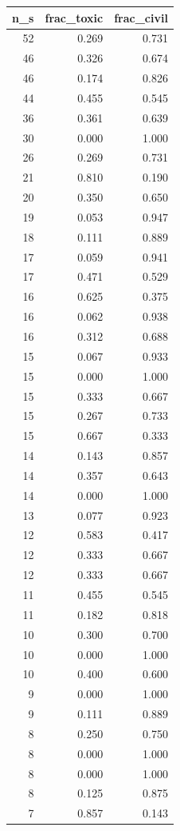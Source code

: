 \begin{tabular}{rrr}
\toprule
n_s & frac_toxic & frac_civil \\
\midrule
52 & 0.269 & 0.731 \\
46 & 0.326 & 0.674 \\
46 & 0.174 & 0.826 \\
44 & 0.455 & 0.545 \\
36 & 0.361 & 0.639 \\
30 & 0.000 & 1.000 \\
26 & 0.269 & 0.731 \\
21 & 0.810 & 0.190 \\
20 & 0.350 & 0.650 \\
19 & 0.053 & 0.947 \\
18 & 0.111 & 0.889 \\
17 & 0.059 & 0.941 \\
17 & 0.471 & 0.529 \\
16 & 0.625 & 0.375 \\
16 & 0.062 & 0.938 \\
16 & 0.312 & 0.688 \\
15 & 0.067 & 0.933 \\
15 & 0.000 & 1.000 \\
15 & 0.333 & 0.667 \\
15 & 0.267 & 0.733 \\
15 & 0.667 & 0.333 \\
14 & 0.143 & 0.857 \\
14 & 0.357 & 0.643 \\
14 & 0.000 & 1.000 \\
13 & 0.077 & 0.923 \\
12 & 0.583 & 0.417 \\
12 & 0.333 & 0.667 \\
12 & 0.333 & 0.667 \\
11 & 0.455 & 0.545 \\
11 & 0.182 & 0.818 \\
10 & 0.300 & 0.700 \\
10 & 0.000 & 1.000 \\
10 & 0.400 & 0.600 \\
9 & 0.000 & 1.000 \\
9 & 0.111 & 0.889 \\
8 & 0.250 & 0.750 \\
8 & 0.000 & 1.000 \\
8 & 0.000 & 1.000 \\
8 & 0.125 & 0.875 \\
7 & 0.857 & 0.143 \\

\end{tabular}
